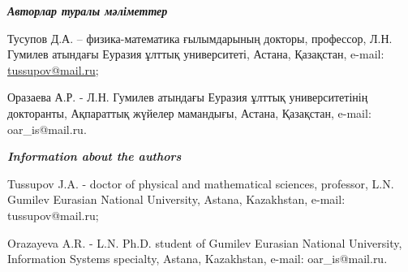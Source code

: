 \begin{authorinfo}
\hspace{1em}\emph{{\bfseries Авторлар туралы мәліметтер}}

Тусупов Д.А. -- физика-математика ғылымдарының докторы, профессор, Л.Н.
Гумилев атындағы Еуразия ұлттық университеті, Астана, Қазақстан, e-mail:
\href{mailto:oaris.83@gmail.com}{tussupov@mail.ru};

Оразаева А.Р. - Л.Н. Гумилев атындағы Еуразия ұлттық университетінің
докторанты, Ақпараттық жүйелер мамандығы, Астана, Қазақстан, e-mail:
oar\_is@mail.ru.

\hspace{1em}\emph{{\bfseries Information about the authors}}

Tussupov J.A. - doctor of physical and mathematical sciences, professor,
L.N. Gumilev Eurasian National University, Astana, Kazakhstan, e-mail:
tussupov@mail.ru;

Orazayeva A.R. - L.N. Ph.D. student of Gumilev Eurasian National
University, Information Systems specialty, Astana, Kazakhstan, e-mail:
oar\_is@mail.ru.
\end{authorinfo}
